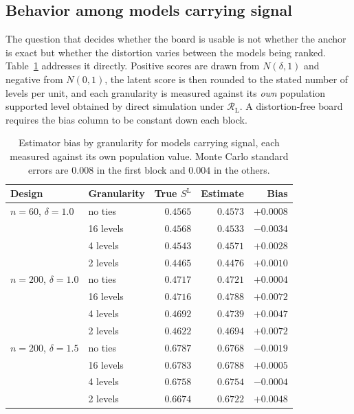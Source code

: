 \documentclass[11pt]{article}
\newcommand{\Regime}{\mathcal{R}}
\newcommand{\RegimeL}{\Regime_{\mathrm{L}}}
\newcommand{\SLead}{S^{\mathrm{L}}}
\theoremstyle{remark}
\begin{document}
\subsection{Behavior among models carrying signal}

The question that decides whether the board is usable is not whether the anchor is exact but whether the distortion varies between the models being ranked. Table~\ref{tab:anchor-signal} addresses it directly. Positive scores are drawn from $N(\delta,1)$ and negative from $N(0,1)$, the latent score is then rounded to the stated number of levels per unit, and each granularity is measured against its \emph{own} population supported level obtained by direct simulation under $\RegimeL$. A distortion-free board requires the bias column to be constant down each block.

\begin{table}[ht]
\centering
\caption{Estimator bias by granularity for models carrying signal, each measured against its own population value. Monte Carlo standard errors are $0.008$ in the first block and $0.004$ in the others.}
\label{tab:anchor-signal}
\begin{tabular}{@{}llrrr@{}}
\toprule
Design & Granularity & True $\SLead$ & Estimate & Bias \\
\midrule
$n=60$, $\delta=1.0$ & no ties & $0.4565$ & $0.4573$ & $+0.0008$ \\
 & 16 levels & $0.4568$ & $0.4533$ & $-0.0034$ \\
 & 4 levels & $0.4543$ & $0.4571$ & $+0.0028$ \\
 & 2 levels & $0.4465$ & $0.4476$ & $+0.0010$ \\
\midrule
$n=200$, $\delta=1.0$ & no ties & $0.4717$ & $0.4721$ & $+0.0004$ \\
 & 16 levels & $0.4716$ & $0.4788$ & $+0.0072$ \\
 & 4 levels & $0.4692$ & $0.4739$ & $+0.0047$ \\
 & 2 levels & $0.4622$ & $0.4694$ & $+0.0072$ \\
\midrule
$n=200$, $\delta=1.5$ & no ties & $0.6787$ & $0.6768$ & $-0.0019$ \\
 & 16 levels & $0.6783$ & $0.6788$ & $+0.0005$ \\
 & 4 levels & $0.6758$ & $0.6754$ & $-0.0004$ \\
 & 2 levels & $0.6674$ & $0.6722$ & $+0.0048$ \\
\bottomrule
\end{tabular}
\end{table}
\end{document}
